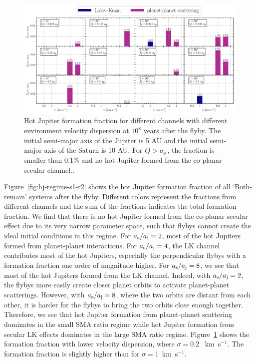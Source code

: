\documentclass[twocolumn]{aastex63}
\newcommand*\fgr[1]{Figure~\ref{#1}}
\begin{document}
\begin{figure}
    \centering
    \includegraphics[width=\textwidth]{figs/hj-regime-dispersion.pdf}
    \caption{Hot Jupiter formation fraction for different channels with different environment velocity dispersion at $10^8$ years after the flyby. The initial semi-major axis of the Jupiter is 5 AU and the initial semi-major axis of the Saturn is 10 AU. For $Q>a_{\rm p}$, the fraction is smaller than 0.1\% and no hot Jupiter formed from the co-planar secular channel..}
    \label{fig:hj-regime-s02-r2}
\end{figure}
\fgr{fig:hj-regime-s1-r2} shows the hot Jupiter formation fraction of all `Both-remain' systems after the flyby. Different colors represent the fractions from different channels and the sum of the fractions indicates the total formation fraction. We find that there is no hot Jupiter formed from the co-planar secular effect due to its very narrow parameter space, such that flybys cannot create the ideal initial conditions in this regime. For $a_{\rm s}/a_{\rm j}=2$, most of the hot Jupiters formed from planet-planet interactions. For $a_{\rm s}/a_{\rm j}=4$, the LK channel contributes most of the hot Jupiters, especially the perpendicular flybys with a formation fraction one order of magnitude higher. For $a_{\rm s}/a_{\rm j}=8$, we see that most of the hot Jupiters formed from the LK channel. Indeed, with $a_{\rm s}/a_{\rm j}=2$, the flybys more easily create closer planet orbits to activate planet-planet scatterings. However, with $a_{\rm s}/a_{\rm j}=8$, where the two orbits are distant from each other, it is harder for the flybys to bring the two orbits close enough together. Therefore, we see that hot Jupiter formation from planet-planet scattering dominates in the small SMA ratio regime while hot Jupiter formation from secular LK effects dominates in the large SMA ratio regime. \fgr{fig:hj-regime-s02-r2} shows the formation fraction with lower velocity dispersion, where $\sigma=$0.2 ~km~s$^{-1}$. The formation fraction is slightly higher than for $\sigma=$1~km~s$^{-1}$.
\end{document}

